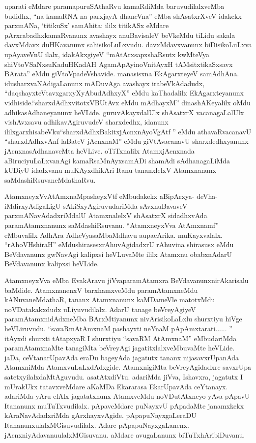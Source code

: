 \begin{artha}
uparati eMdare paramapuruSAthaRvu kamaRdiMda baruvudilalxveMba budidhx, ``na kamaRNA na parxjayA dhaneVna'' eMba shAsatxrXveV idakekx parxmANa, `titikuSx' samAhita: ililx titikASx eMdare pArxrabadhxkamaRvanunx avashayx anuBavisaleV beVkeMdu tiLidu sakala davxMdavx duHKavanunx sahisikoLuLxvudu. davxMdavxvanunx biDisikoLuLxva upAyaveVnU ilalx, idakAkxgiyeV ``mAtArxsapxshaRsutx kwMteVya shiVtoVSaNxsuKaduHKadAH AgamApAyinoV\s nitAyxH tAMsitxtikaSxsavx BArata'' eMdu giVtoVpadeVshavide. manasisxna EkAgarxteyeV samAdhAna. idu\break sharxvaNAdigaLanunx mADuvAga avashayx irabeVkAdadudx, ``daqshayxteVtavxgarxyXyAbudAdhxyX'' eMdu kaThadalilx EkAgarxteyanunx vidhiside.\break ``sharxdAdhxvitotxVBUtAvx eMdu mAdhayxM'' dinashAKeyalilx oMdu adhikasAdhaneyanunx heVLide. guruvAkayxdalUlx shAsatxrX vacanagaLalUlx vishAvxsavu adhikavAgiruvudeV sharxdedhx, idanunx ililxgarxhisabeVku\ndash  ``sharxdAdhxBakitxjAcnxnAyoVgAtf '' eMdu athavaRvacanavU ``sharxdAdhxvAnf laBateV jAcnxnaM'' eMdu giVtAvacanavU sharxdedhxyanunx jAcnxnasAdhanaveMta heVLive. oTiTxnalilx AtamxjAcnxnada aBiruciyuLaLxvanAgi kamaRsaMnAyxsamADi shamAdi sAdhanagaLiMda kUDiyU idadxvanu muKAyxdhikAri Itanu tananxlelxV Atamxnanunx saMdashiRsuvaneMdathaRvu.
\end{artha}

\begin{artha}
AtamxneyxVvAtAmxnaMpasheyxVtf eMbudakekx aBipArxya- deVha-\break iMdirxyAdigaLigU sAkiSxyAgiruvudariMda sAvxnuBavaveV parxmANavAdadxriMdalU AtamxnalelxV shAsatxrX sidadhxvAda paramAtamxnanunx saMdashiRsuvanu. ``AtamxneyxVva AtAmxnamf'' eMbuvalilx AdhAra AdheVya\break saMbaMdhavu aupacArika. muKayxvalalx. ``rAhoVHshiraH'' eMdu\break shirasesxrAhuvAgidadxrU rAhuvina shirasusx eMdu BeVdavanunx gwNavAgi kalipxsi heVLuvaMte ililx Atamxnu obabxnAdarU BeVdavanunx kalipxsi heVLide.
\end{artha}

\begin{artha}
AtamxneyxVva eMba EvakAravu jiVvaparamAtamxra BeVdavanunx\break nirAkarisalu baMdide. AtamxnanenxV barxhamxveMdu paramAtamxneMdu kANuvaneMdathaR, tananx Atamxnanunx kaMDameVle matotxMdu noVDatakakxdudx uLiyuvudilalx. AdarU tanage beVreyAgiyeV paramAtamxnidAdxneMba BArxMtiyanunx nivArisikoLaLxlu shurxtiyu hiVge heVLiruvudu. ``savaRmAtAmxnaM pashayxti neYnaM pApAmxtarati...... '' itAyxdi shurxti tAtapxyaR I shurxtiyu ``savaRM AtAmxnaM'' eMbudariMda paramAtamxnaMte tanagiMta beVreyAgi jagatitxlalxveMbuvaMte heVLide. jaDa, ceVtanarUpavAda eraDu bageyAda jagatutx tananx nijasavxrUpanAda AtamxniMda AtamxvuLaLxdAdxgide. AtamxnigiMta beVreyAgidadxre savxrUpa satetxyilalxdaMtAguvudu. asatAtxdiVtu. adariMda jiVva, Ishavxra, jagatutx I mUrakUkx tatavxveMdare aKaMDa Ekararasa EkarUpavAda ceYtanayx. adariMda yAru elAlx jagatatxnunx AtamxveMdu noVDutAtxneyo yAva pApavU Itananunx muTuTxvudilalx. pApaveMdare puNayxvU pApadaMte janamxkekx kAraNavAdadxriMda gArxhayxvAgide. pApapuNayxgaLeraDU Itananunx\break ulalxMGisuvudilalx. Adare pApapuNayxgaLanenx. jAcnxniyAdavanu\break ulalxMGisuvanu. aMdare avugaLanunx biTuTxhAribiDuvanu. 
\end{artha}

